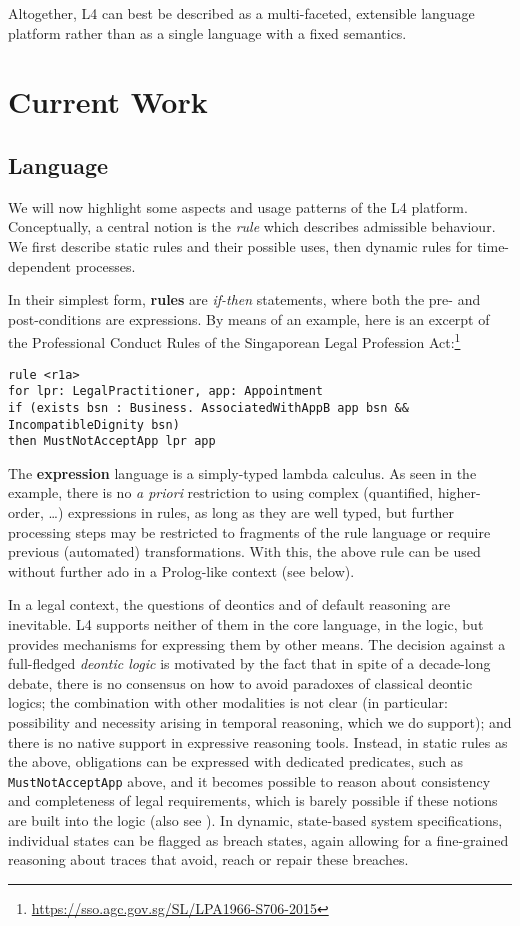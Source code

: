 \documentclass[runningheads]{llncs}
\begin{document}
Altogether, L4 can best be described as a multi-faceted, extensible language
platform rather than as a single language with a fixed semantics.

\section{Current Work}\label{sec:current_work}

\subsection{Language}\label{sec:language}

We will now highlight some aspects and usage patterns of the L4
platform. Conceptually, a central notion is the \emph{rule} which describes
admissible behaviour. We first describe static rules and their possible uses,
then dynamic rules for time-dependent processes.

In their simplest form, \textbf{rules} are \emph{if-then} statements, where both the
pre- and post-conditions are expressions. By means of an example, here is an
excerpt of the Professional Conduct Rules of the Singaporean Legal Profession
Act:\footnote{\url{https://sso.agc.gov.sg/SL/LPA1966-S706-2015}}

\begin{lstlisting}
rule <r1a>
for lpr: LegalPractitioner, app: Appointment
if (exists bsn : Business. AssociatedWithAppB app bsn && IncompatibleDignity bsn)
then MustNotAcceptApp lpr app
\end{lstlisting}

The \textbf{expression} language is a simply-typed lambda calculus. As seen in
the example, there is no \emph{a priori} restriction to using complex
(quantified, higher-order, \dots) expressions in rules, as long as they are
well typed, but further processing steps may be restricted to fragments of the
rule language or require previous (automated) transformations. With this, the
above rule can be used without further ado in a Prolog-like context (see
below).

In a legal context, the questions of deontics and of default reasoning are
inevitable. L4 supports neither of them in the core language, \ie{} in the logic, but
provides mechanisms for expressing them by other means. The decision against a
full-fledged \emph{deontic logic} is motivated by the fact that in spite of a
decade-long debate, there is no consensus on how to avoid paradoxes of
classical deontic logics; the combination with other modalities is not clear
(in particular: possibility and necessity arising in temporal reasoning, which
we do support); and there is no native support in expressive reasoning
tools. Instead, in static rules as the above, obligations can be expressed
with dedicated predicates, such as \texttt{MustNotAcceptApp} above, and it
becomes possible to reason about consistency and completeness of legal
requirements, which is barely possible if these notions are built into the
logic (also see ). In dynamic, state-based system
specifications, individual states can be flagged as breach states, again
allowing for a fine-grained reasoning about traces that avoid, reach or repair
these breaches.
\end{document}
